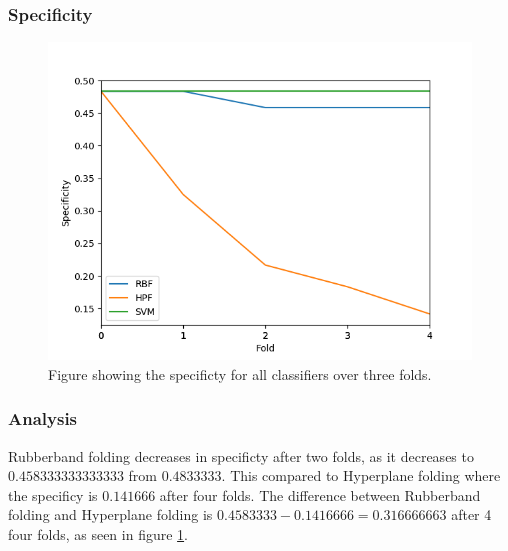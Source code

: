 \documentclass[a4paper,twoside]{bth}
\begin{document}
\subsubsection{Specificity}
\begin{figure}[!htb]
\centering
\includegraphics[scale=0.7]{images/result-hep/Specificity.png}
   \caption{Figure showing the specificty for all classifiers over three folds.}
   \label{fig:hep-Specificty}
\end{figure}

\FloatBarrier

\subsubsection{Analysis}
Rubberband folding decreases in specificty after two folds, as it decreases to $0.458333333333333$ from $0.4833333$. This compared to Hyperplane folding where the specificy is $0.141666$ after four folds. The difference between Rubberband folding and Hyperplane folding is $0.4583333 - 0.1416666 = 0.316666663$ after 4 four folds, as seen in figure \ref{fig:hep-Specificty}.

\clearpage
\FloatBarrier
\end{document}
